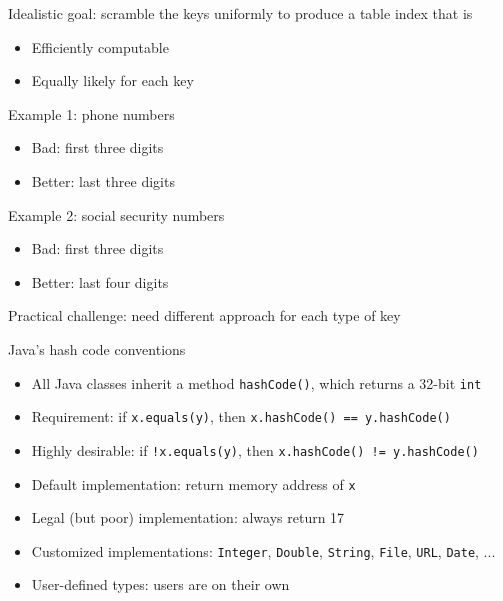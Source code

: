 \documentclass[8pt,a4paper,compress]{beamer}
\begin{document}
\begin{frame}[fragile]
\pause

Idealistic goal: scramble the keys uniformly to produce a table index that is
\begin{itemize}
\item Efficiently computable

\item Equally likely for each key
\end{itemize}

\pause
\bigskip

Example 1: phone numbers
\begin{itemize}
\item Bad: first three digits

\item Better: last three digits
\end{itemize}

\pause
\bigskip

Example 2: social security numbers
\begin{itemize}
\item Bad: first three digits

\item Better: last four digits
\end{itemize}

\pause
\bigskip

Practical challenge: need different approach for each type of key
\end{frame}

\begin{frame}[fragile]
\pause

Java's hash code conventions
\begin{itemize}
\item All Java classes inherit a method \lstinline{hashCode()}, which returns a 32-bit \lstinline{int}

\item Requirement: if \lstinline{x.equals(y)}, then \lstinline{x.hashCode() == y.hashCode()}

\item Highly desirable: if \lstinline{!x.equals(y)}, then \lstinline{x.hashCode() != y.hashCode()}

\item Default implementation: return memory address of \lstinline{x}

\item Legal (but poor) implementation: always return 17

\item Customized implementations: \lstinline{Integer}, \lstinline{Double}, \lstinline{String}, \lstinline{File}, \lstinline{URL}, \lstinline{Date}, ...

\item User-defined types: users are on their own
\end{itemize}
\end{frame}
\end{document}
